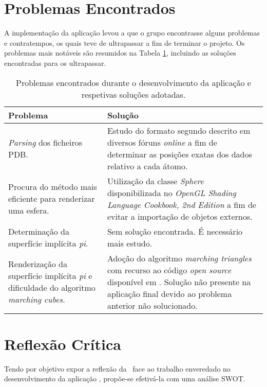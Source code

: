 \section{Problemas Encontrados}
\label{sec::reflexao:problemas}

A implementação da aplicação levou a que o grupo encontrasse alguns problemas e contratempos, os quais teve de ultrapassar a fim de terminar o projeto. Os problemas mais notáveis são resumidos na Tabela \ref{tab::problemas}, incluindo as soluções encontradas para os ultrapassar.

\begin{table}[!htbp]
	\centering
	\begin{tabular}{p{} p{}}
		\toprule
		{\bfseries Problema} & {\bfseries Solução} \\
		\midrule
		\midrule
        \textit{Parsing} dos ficheiros \ac{PDB}. & Estudo do formato segundo descrito em diversos fóruns \textit{online} a fim de determinar as posições exatas dos dados relativo a cada átomo. \\
        \midrule
		Procura do método mais eficiente para renderizar uma esfera. & Utilização da classe \textit{Sphere} disponibilizada no \textit{OpenGL Shading Language Cookbook, 2nd Edition} \cite{vbosphere} a fim de evitar a importação de objetos externos. \\
		\midrule
		Determinação da superfície implícita \textit{pi}. & Sem solução encontrada. É necessário mais estudo. \\
		\midrule
		Renderização da superfície implícita \textit{pi} e dificuldade do algoritmo \textit{marching cubes}. & Adoção do algoritmo \textit{marching triangles} com recurso ao código \textit{open source} disponível em \cite{marchingtriangles}. Solução não presente na aplicação final devido ao problema anterior não solucionado. \\
		\bottomrule
	\end{tabular}
	\caption[Problemas encontrados e respetivas soluções]{Problemas encontrados durante o desenvolvimento da aplicação e respetivas soluções adotadas.}
	\label{tab::problemas}
\end{table}



\section{Reflexão Crítica}
\label{sec::reflexao:critica}

Tendo por objetivo expor a reflexão da \groupname~face ao trabalho enveredado no desenvolvimento da aplicação \theapp, propõe-se efetivá-la com uma análise \ac{SWOT}.


